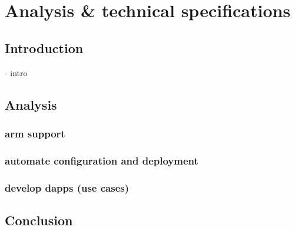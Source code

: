 

\chapter{Analysis \& technical specifications}



\section{Introduction}
- intro


\section{Analysis}
    \subsection{arm support}
    \subsection{automate configuration and deployment}
    \subsection{develop dapps (use cases)}

\section{Conclusion}
